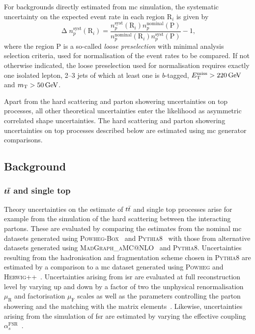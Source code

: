  For backgrounds directly estimated from \gls{mc} simulation, the systematic uncertainty on the expected event rate in each region R$_i$ is given by
 \begin{equation}
 	\upDelta n_p^\mathrm{syst}(\mathrm{R}_i) = \frac{n_p^\mathrm{syst}(\mathrm{R}_i)n_p^\mathrm{nominal}(\mathrm{P})}{n_p^\mathrm{nominal}(\mathrm{R}_i)n_p^\mathrm{syst}(\mathrm{P})} - 1,
 \end{equation}
 where the region P is a so-called \textit{loose preselection} with minimal analysis selection criteria, used for normalisation of the event rates to be compared.
 If not otherwise indicated, the loose preselection used for normalisation requires exactly one isolated lepton, 2--3 jets of which at least one is \textit{b}-tagged, $\etmiss>\SI{220}{\GeV}$ and $\mt>\SI{50}{\GeV}$.
 
 Apart from the hard scattering and parton showering uncertainties on top processes, all other theoretical uncertainties enter the likelihood as asymmetric correlated shape uncertainties.
 The hard scattering and parton showering uncertainties on top processes described below are estimated using \gls{mc} generator comparisons.
 
 \subsection{Background}
 
 \subsubsection{$\makemebold{\ttbar}$ and single top}
 
 Theory uncertainties on the estimate of $t\bar{t}$ and single top processes arise for example from the simulation of the hard scattering between the interacting partons.
 These are evaluated by comparing the estimates from the nominal \gls{mc} datasets generated using \textsc{Powheg-Box}~\cite{PowhegBox:2010xd} and \textsc{Pythia8}~\cite{Pythia8:2007gs} with those from alternative datasets generated using \textsc{MadGraph\_aMC@NLO}~\cite{MGaMCNLO:2014hca,Frederix:2012ps} and \textsc{Pythia8}.
 Uncertainties resulting from the hadronisation and fragmentation scheme chosen in \textsc{Pythia8} are estimated by a comparison to a \gls{mc} dataset generated using \textsc{Powheg} and \textsc{Herwig++}~\cite{Herwig:2015jjp}.
 Uncertainties arising from \gls{isr} are evaluated at full reconstruction level by varying up and down by a factor of two the unphysical renormalisation $\mu_\mathrm{R}$ and factorisation $\mu_\mathrm{F}$ scales as well as the parameters controlling the parton showering and the matching with the matrix elements~\cite{ATL-PHYS-PUB-2016-004}.
 Likewise, uncertainties arising from the simulation of \gls{fsr} are estimated by varying the effective coupling $\alpha_s^{\mathrm{FSR}}$~\cite{ATL-PHYS-PUB-2016-004}. 
 
